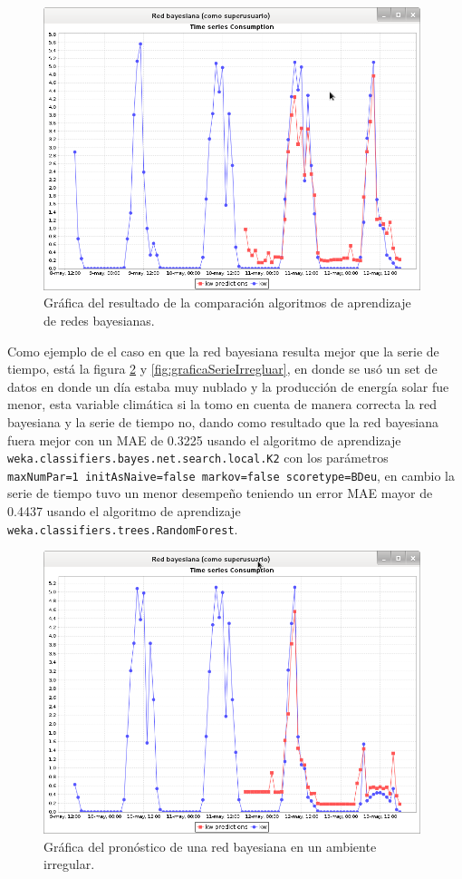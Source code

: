 \begin{figure}[!ht]
	\centering
	\includegraphics[width=11cm]{img/graficaResultadosCompRed.png}
	\caption{Gráfica del resultado de la comparación algoritmos de aprendizaje de redes bayesianas.}
	\label{fig:GraficaResultadosCompRed}
\end{figure}

Como ejemplo de el caso en que la red bayesiana resulta mejor que la serie de tiempo, está la 
figura \ref{fig:graficaRedBayesianaIrregluar} y \ref{fig:graficaSerieIrregluar}, 
en donde se usó un set de datos en donde un día estaba muy nublado y la producción de energía solar fue menor, esta variable climática si la tomo en cuenta de manera correcta la red bayesiana y la serie de tiempo no, dando como resultado que la red bayesiana fuera mejor con un MAE de 0.3225 usando el algoritmo de aprendizaje \texttt{weka.classifiers.bayes.net.search.local.K2} con los parámetros \texttt{maxNumPar=1 initAsNaive=false markov=false scoretype=BDeu}, en cambio la serie de tiempo tuvo un menor desempeño teniendo un error MAE mayor de 0.4437 usando el algoritmo de aprendizaje \texttt{weka.classifiers.trees.RandomForest}.

\begin{figure}[!h]
	\centering
	\includegraphics[width=11cm]{img/graficaRedBayesianaIrregluar.png}
	\caption{Gráfica del pronóstico de una red bayesiana en un ambiente irregular.}
	\label{fig:graficaRedBayesianaIrregluar}
\end{figure}

